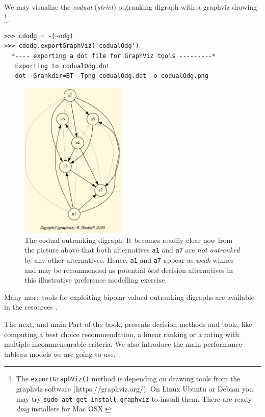 We may visualize the \emph{codual} ({\em strict\/}) outranking digraph with a graphviz drawing \footnote{The \texttt{exportGraphViz()} method is depending on drawing tools from the graphviz software (https://graphviz.org/). On Linux Ubuntu or Debian you may try \texttt{sudo apt-get install graphviz} to install them. There are ready \emph{dmg} installers for Mac OSX.}.
\begin{lstlisting}
>>> cdodg = -(~odg)
>>> cdodg.exportGraphViz('codualOdg')
  *---- exporting a dot file for GraphViz tools ---------*
   Exporting to codualOdg.dot
   dot -Grankdir=BT -Tpng codualOdg.dot -o codualOdg.png
\end{lstlisting}
\begin{figure}[h]
\sidecaption[t]
\includegraphics[width=5cm]{Figures/codualOdg.png}
\caption{The codual outranking digraph. It becomes readily clear now from the picture above that both alternatives \texttt{a1}  and \texttt{a7} are {\em not outranked\/} by any other alternatives. Hence, \texttt{a1}  and \texttt{a7} appear as \emph{weak} \Condorcet winner and may be recommended as potential \emph{best} decision alternatives in this illustrative preference modelling exercise.}
\label{fig:3.1}       %
\end{figure}
 
Many more tools for exploiting bipolar-valued outranking digraphs are available in the \Digraph resources \citep{BIS-2021}.
\vspace{1cm}

The next, and main Part of the book, presents decision methods and tools, like computing a best choice recommendation, a linear ranking or a rating with multiple incommensurable criteria. We also introduce the main performance tableau models we are going to use.  

{}
